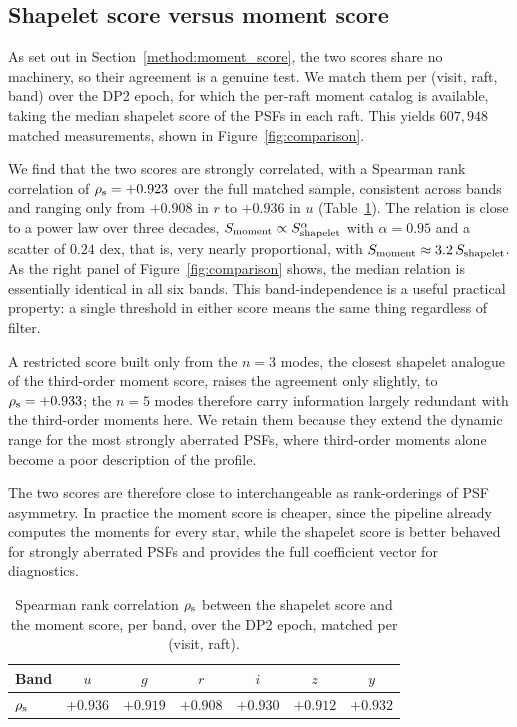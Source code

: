 \documentclass[]{spie}
\newcommand{\sshape}{S_{\rm shapelet}}
\newcommand{\smom}{S_{\rm moment}}
\begin{document}
\subsection{Shapelet score versus moment score}
\label{results:score_comparison}

As set out in Section~\ref{method:moment_score}, the two scores share no machinery, so their
agreement is a genuine test. We match them per (visit, raft, band)
over the DP2 epoch, for which the per-raft moment catalog is available, taking the median
shapelet score of the PSFs in each raft. This yields $607{,}948$ matched measurements, shown
in Figure~\ref{fig:comparison}.

We find that the two scores are strongly correlated, with a Spearman rank correlation of
$\rho_{\rm s} = +0.923$ over the full matched sample, consistent across bands and ranging
only from $+0.908$ in $r$ to $+0.936$ in $u$ (Table~\ref{tab:rho}). The relation is close to
a power law over three decades, $\smom \propto \sshape^{\alpha}$ with $\alpha = 0.95$ and a
scatter of $0.24$ dex, that is, very nearly proportional, with
$\smom \approx 3.2\,\sshape$. As the right panel of Figure~\ref{fig:comparison} shows, the
median relation is essentially identical in all six bands. This band-independence is a
useful practical property: a single threshold in either score means the same thing
regardless of filter.

A restricted score built only from the $n = 3$ modes, the closest shapelet analogue of the
third-order moment score, raises the agreement only slightly, to $\rho_{\rm s} = +0.933$;
the $n = 5$ modes therefore carry information largely redundant with the third-order moments
here. We retain them because they extend the dynamic range for the most strongly aberrated
PSFs, where third-order moments alone become a poor description of the profile.

The two scores are therefore close to interchangeable as rank-orderings of PSF asymmetry. In
practice the moment score is cheaper, since the pipeline already computes the moments for
every star, while the shapelet score is better behaved for strongly aberrated PSFs and
provides the full coefficient vector for diagnostics.

\begin{table}[htbp]
\caption{Spearman rank correlation $\rho_{\rm s}$ between the shapelet score and the moment
score, per band, over the DP2 epoch, matched per (visit, raft).}
\label{tab:rho}
\begin{center}
\begin{tabular}{lcccccc}
\toprule
Band & $u$ & $g$ & $r$ & $i$ & $z$ & $y$ \\
\midrule
$\rho_{\rm s}$ & $+0.936$ & $+0.919$ & $+0.908$ & $+0.930$ & $+0.912$ & $+0.932$ \\
\bottomrule
\end{tabular}
\end{center}
\end{table}
\end{document}
